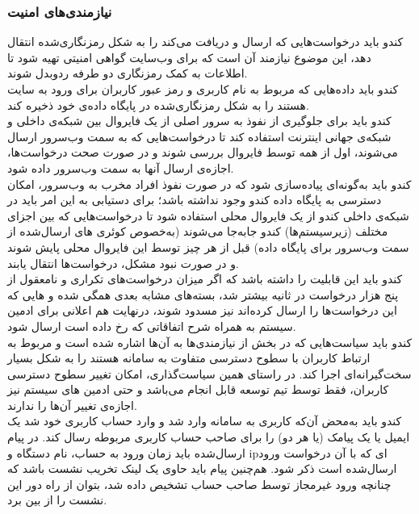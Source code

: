\documentclass{report}
\begin{document}
\subsubsection*{نیازمندی‌های امنیت}
\begin{adjustwidth}{2em}{0pt}
کندو باید درخواست‌هایی که ارسال و دریافت می‌کند را به شکل رمزنگاری‌شده
 انتقال دهد، این موضوع نیازمند آن است که برای وب‌سایت گواهی امنیتی 
 تهیه شود تا اطلاعات به کمک رمزنگاری دو طرفه ردوبدل شوند.
\\
کندو باید داده‌هایی که مربوط به نام کاربری و رمز عبور کاربران برای ورود به سایت هستند را به شکل رمزنگاری‌شده در پایگاه داده‌ی خود ذخیره کند.
\\
کندو باید برای جلوگیری از نفوذ به سرور اصلی از یک فایروال بین شبکه‌ی داخلی و شبکه‌ی جهانی اینترنت استفاده کند تا درخواست‌هایی که به سمت وب‌سرور ارسال می‌شوند، اول از همه توسط فایروال بررسی شوند و در صورت صحت درخواست‌ها، اجازه‌ی ارسال آنها به سمت وب‌سرور داده شود.
\\
کندو باید به‌گونه‌ای پیاده‌سازی شود که در صورت نفوذ افراد مخرب به وب‌سرور، امکان دسترسی به پایگاه داده کندو وجود نداشته باشد؛ برای دستیابی به این امر باید در شبکه‌ی داخلی کندو از یک فایروال محلی
 استفاده شود تا درخواست‌هایی که بین اجزای مختلف (زیرسیستم‌ها) کندو جابه‌جا می‌شوند (به‌خصوص کوئری های ارسال‌شده از سمت وب‌سرور برای پایگاه داده) قبل از هر چیز توسط این فایروال محلی پایش شوند و در صورت نبود مشکل، درخواست‌ها انتقال یابند.
\\
کندو باید این قابلیت را داشته باشد که اگر میزان درخواست‌های تکراری و نامعقول از پنج هزار درخواست در ثانیه بیشتر شد، بسته‌های مشابه بعدی همگی 
 شده و 
 هایی که این درخواست‌ها را ارسال کرده‌اند نیز مسدود شوند، درنهایت هم اعلانی برای ادمین سیستم به همراه شرح اتفاقاتی که رخ داده است ارسال شود.
\\
 کندو باید سیاست‌هایی که در بخش 
 \hyperlink{ww}{\underline{}} 
 از نیازمندی‌ها به آن‌ها اشاره شده است و مربوط به ارتباط کاربران با سطوح دسترسی متفاوت به سامانه هستند را به شکل بسیار سخت‌گیرانه‌ای اجرا کند. در راستای همین سیاست‌گذاری، امکان تغییر سطوح دسترسی کاربران، فقط توسط تیم توسعه قابل انجام می‌باشد و حتی ادمین های سیستم نیز اجازه‌ی تغییر آن‌ها را ندارند.
\\
کندو باید به‌محض آن‌که کاربری به سامانه وارد شد
 و وارد حساب کاربری خود شد یک ایمیل یا یک پیامک (یا هر دو) را برای صاحب حساب کاربری مربوطه رسال کند. در پیام ارسال‌شده باید زمان ورود به حساب، نام دستگاه و ipای که با آن درخواست ورود ارسال‌شده است ذکر شود. هم‌چنین پیام باید حاوی یک لینک تخریب نشست باشد که چنانچه ورود غیرمجاز توسط صاحب حساب تشخیص داده شد، بتوان از راه دور این نشست را از بین برد.
\end{adjustwidth}
\end{document}
